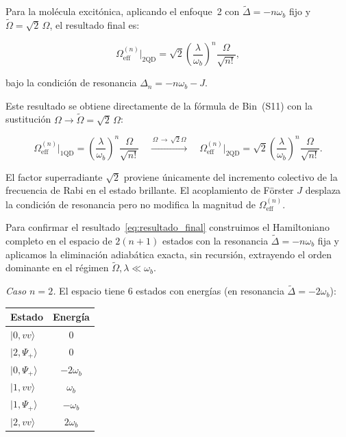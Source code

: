 \documentclass[12pt]{article}
\begin{document}
	\noindent
	Para la mol\'ecula excit\'onica, aplicando el enfoque~2 con
	$\widetilde\Delta = -n\omega_b$ fijo y $\widetilde\Omega = \sqrt{2}\,\Omega$,
	el resultado final es:
	
	\begin{equation}
		\boxed{
			\Omega_\mathrm{eff}^{(n)}\big|_{2\mathrm{QD}}
			= \sqrt{2}\left(\frac{\lambda}{\omega_b}\right)^n\frac{\Omega}{\sqrt{n!}},
		}
		\label{eq:resultado_final}
	\end{equation}
	
	bajo la condici\'on de resonancia $\Delta_n = -n\omega_b - J$.
	
	\medskip
	\noindent
	Este resultado se obtiene directamente de la f\'ormula de Bin~(S11) con la
	sustituci\'on $\Omega\to\widetilde\Omega = \sqrt{2}\,\Omega$:
	
	\begin{equation}
		\Omega_\mathrm{eff}^{(n)}\big|_\mathrm{1QD}
		= \left(\frac{\lambda}{\omega_b}\right)^n\frac{\Omega}{\sqrt{n!}}
		\quad\xrightarrow{\,\Omega\,\to\,\sqrt{2}\Omega\,}\quad
		\Omega_\mathrm{eff}^{(n)}\big|_{2\mathrm{QD}}
		= \sqrt{2}\left(\frac{\lambda}{\omega_b}\right)^n\frac{\Omega}{\sqrt{n!}}.
	\end{equation}
	
	\noindent
	El factor superradiante $\sqrt{2}$ proviene \'unicamente del incremento
	colectivo de la frecuencia de Rabi en el estado brillante. El acoplamiento
	de F\"orster $J$ desplaza la condici\'on de resonancia pero no modifica la
	magnitud de $\Omega_\mathrm{eff}^{(n)}$.
	
	
	Para confirmar el resultado~\eqref{eq:resultado_final} construimos el
	Hamiltoniano completo en el espacio de $2(n+1)$ estados con la resonancia
	$\widetilde\Delta = -n\omega_b$ fija y aplicamos la eliminaci\'on adiab\'atica
	exacta, sin recursi\'on, extrayendo el orden dominante en el r\'egimen
	$\widetilde\Omega, \lambda \ll \omega_b$.
	
	\medskip
	\noindent
	\textit{Caso $n = 2$.}
	El espacio tiene 6 estados con energ\'ias (en resonancia $\widetilde\Delta =
	-2\omega_b$):
	
	\begin{center}
		\begin{tabular}{lc}
			Estado & Energ\'ia \\
			\hline
			$|0, vv\rangle$ & $0$ \\
			$|2, \Psi_+\rangle$ & $0$ \\
			$|0, \Psi_+\rangle$ & $-2\omega_b$ \\
			$|1, vv\rangle$ & $\omega_b$ \\
			$|1, \Psi_+\rangle$ & $-\omega_b$ \\
			$|2, vv\rangle$ & $2\omega_b$ \\
		\end{tabular}
	\end{center}
	
\end{document}
